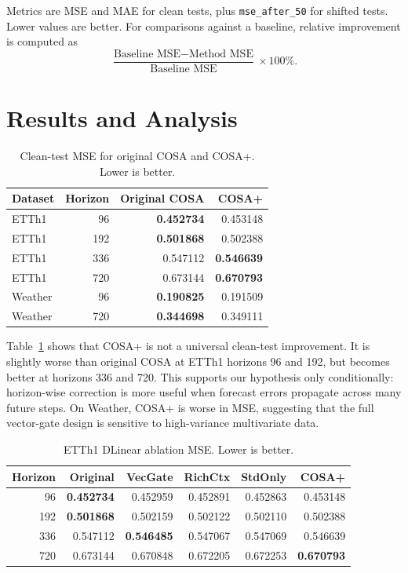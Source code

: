 \documentclass[10pt]{article}
\begin{document}
Metrics are MSE and MAE for clean tests, plus \texttt{mse\_after\_50} for shifted tests. Lower values are better. For comparisons against a baseline, relative improvement is computed as
\begin{equation}
\frac{\text{Baseline MSE} - \text{Method MSE}}{\text{Baseline MSE}} \times 100\%.
\end{equation}

\section{Results and Analysis}
\begin{table}[H]
\centering
\small
\caption{Clean-test MSE for original COSA and COSA+. Lower is better.}
\begin{tabular}{lrrr}
\toprule
Dataset & Horizon & Original COSA & COSA+ \\
\midrule
ETTh1 & 96 & \textbf{0.452734} & 0.453148 \\
ETTh1 & 192 & \textbf{0.501868} & 0.502388 \\
ETTh1 & 336 & 0.547112 & \textbf{0.546639} \\
ETTh1 & 720 & 0.673144 & \textbf{0.670793} \\
Weather & 96 & \textbf{0.190825} & 0.191509 \\
Weather & 720 & \textbf{0.344698} & 0.349111 \\
\bottomrule
\end{tabular}
\label{tab:clean}
\end{table}

Table~\ref{tab:clean} shows that COSA+ is not a universal clean-test improvement. It is slightly worse than original COSA at ETTh1 horizons 96 and 192, but becomes better at horizons 336 and 720. This supports our hypothesis only conditionally: horizon-wise correction is more useful when forecast errors propagate across many future steps. On Weather, COSA+ is worse in MSE, suggesting that the full vector-gate design is sensitive to high-variance multivariate data.

\begin{table}[H]
\centering
\small
\caption{ETTh1 DLinear ablation MSE. Lower is better.}
\begin{tabular}{rrrrrr}
\toprule
Horizon & Original & VecGate & RichCtx & StdOnly & COSA+ \\
\midrule
96 & \textbf{0.452734} & 0.452959 & 0.452891 & 0.452863 & 0.453148 \\
192 & \textbf{0.501868} & 0.502159 & 0.502122 & 0.502110 & 0.502388 \\
336 & 0.547112 & \textbf{0.546485} & 0.547067 & 0.547069 & 0.546639 \\
720 & 0.673144 & 0.670848 & 0.672205 & 0.672253 & \textbf{0.670793} \\
\bottomrule
\end{tabular}
\label{tab:ablation}
\end{table}
\end{document}
